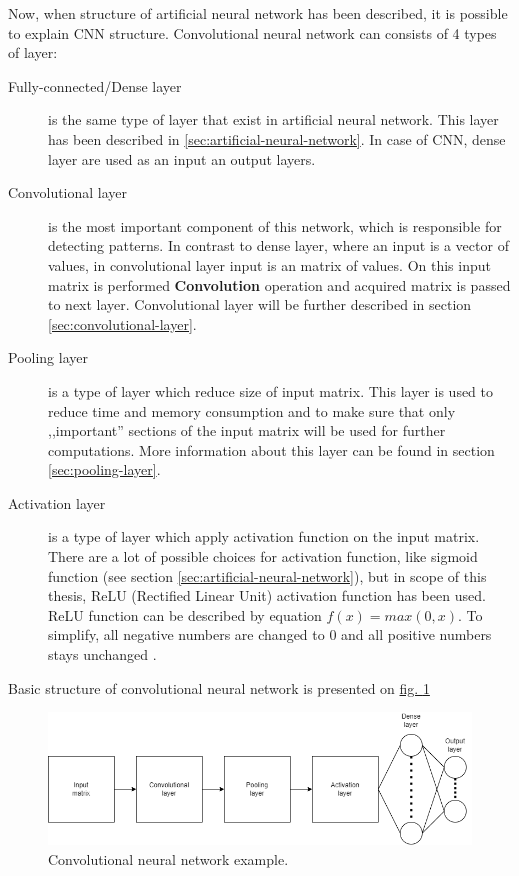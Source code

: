     Now, when structure of artificial neural network has been described, it is possible to explain CNN structure. Convolutional neural network can consists of 4 types of layer:
    \begin{description}
        \item[Fully-connected/Dense layer] is the same type of layer that exist in artificial neural network. This layer has been described in \ref{sec:artificial-neural-network}. In case of CNN, dense layer are used as an input an output layers.
        \item[Convolutional layer] is the most important component of this network, which is responsible for detecting patterns. In contrast to dense layer, where an input is a vector of values, in convolutional layer input is an matrix of values. On this input matrix is performed \textbf{Convolution} operation and acquired matrix is passed to next layer. Convolutional layer will be further described in section \ref{sec:convolutional-layer}.
        \item[Pooling layer] is a type of layer which reduce size of input matrix. This layer is used to reduce time and memory consumption and to make sure that only ,,important'' sections of the input matrix will be used for further computations. More information about this layer can be found in section \ref{sec:pooling-layer}.
        \item[Activation layer] is a type of layer which apply activation function on the input matrix. There are a lot of possible choices for activation function, like sigmoid function (see section \ref{sec:artificial-neural-network}), but in scope of this thesis, ReLU (Rectified Linear Unit) activation function has been used. ReLU function can be described by equation $f(x) = max(0, x)$. To simplify, all negative numbers are changed to $0$ and all positive numbers stays unchanged \cite{bib:internet-relu-function}.
    \end{description}
    Basic structure of convolutional neural network is presented on \hyperref[fig:cnn-example]{fig. \ref*{fig:cnn-example}}
    \begin{figure}
        \centering
        \includegraphics[width=\textwidth]{dependencies/pictures/CNN_example.png}
        \caption{Convolutional neural network example.}
        \label{fig:cnn-example}
    \end{figure}

